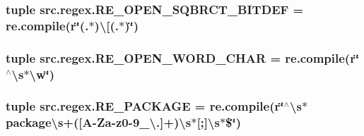 \hypertarget{namespacesrc_1_1regex_af6ea0ac7329ac12f030437327f23ee04}{
\subsubsection[{R\-E\-\_\-\-O\-P\-E\-N\-\_\-\-S\-Q\-B\-R\-C\-T\-\_\-\-B\-I\-T\-D\-E\-F}]{\setlength{\rightskip}{0pt plus 5cm}tuple src.\-regex.\-R\-E\-\_\-\-O\-P\-E\-N\-\_\-\-S\-Q\-B\-R\-C\-T\-\_\-\-B\-I\-T\-D\-E\-F = re.\-compile(r\char`\"{}(.$\ast$)\textbackslash{}\mbox{[}(.$\ast$)\char`\"{})}}\label{namespacesrc_1_1regex_af6ea0ac7329ac12f030437327f23ee04}
\hypertarget{namespacesrc_1_1regex_a015131507b9992fbd10f0bab91847695}{
\subsubsection[{R\-E\-\_\-\-O\-P\-E\-N\-\_\-\-W\-O\-R\-D\-\_\-\-C\-H\-A\-R}]{\setlength{\rightskip}{0pt plus 5cm}tuple src.\-regex.\-R\-E\-\_\-\-O\-P\-E\-N\-\_\-\-W\-O\-R\-D\-\_\-\-C\-H\-A\-R = re.\-compile(r\char`\"{}$^\wedge$\textbackslash{}s$\ast$\textbackslash{}w\char`\"{})}}\label{namespacesrc_1_1regex_a015131507b9992fbd10f0bab91847695}
\hypertarget{namespacesrc_1_1regex_ab1fb0dbc4be0060e4bf4d304e273a9b7}{
\subsubsection[{R\-E\-\_\-\-P\-A\-C\-K\-A\-G\-E}]{\setlength{\rightskip}{0pt plus 5cm}tuple src.\-regex.\-R\-E\-\_\-\-P\-A\-C\-K\-A\-G\-E = re.\-compile(r\char`\"{}$^\wedge$\textbackslash{}s$\ast$package\textbackslash{}s+(\mbox{[}A-\/Za-\/z0-\/9\-\_\-\textbackslash{}.\mbox{]}+)\textbackslash{}s$\ast$\mbox{[};\mbox{]}\textbackslash{}s$\ast$\$\char`\"{})}}\label{namespacesrc_1_1regex_ab1fb0dbc4be0060e4bf4d304e273a9b7}
